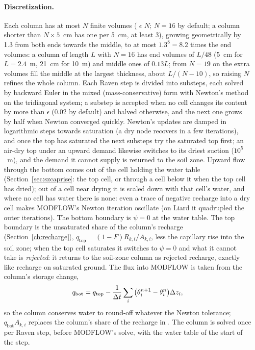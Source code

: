 \paragraph{Discretization.} Each column has at most $N$ finite volumes ( $\epsilon$ $N$;
$N=16$ by default; a column shorter than $N\times5$~cm has one per 5~cm, at least 3), growing geometrically by 1.3 from
both ends towards the middle, to at most $1.3^8=8.2$ times the end volumes: a column of length $L$ with $N=16$ has end
volumes of $L/48$ (5~cm for $L=2.4$~m, 21~cm for 10~m) and middle ones of $0.13L$; from $N=19$ on the extra volumes fill
the middle at the largest thickness, about $L/(N-10)$, so raising $N$ refines the whole column. Each Raven step
is divided into substeps, each solved by backward Euler in the mixed (mass-conservative) form with Newton's method on
the tridiagonal system; a substep is accepted when no cell changes its content by more than $\epsilon$ (0.02 by
default) and halved otherwise, and the next one grows by half when Newton converged quickly. Newton's updates are
damped in logarithmic steps towards saturation (a dry node recovers in a few iterations), and once the top has
saturated the next substeps try the saturated top first; an air-dry top under an upward demand likewise switches to
its driest suction ($10^5$~m), and the demand it cannot supply is returned to the soil zone. Upward flow through the
bottom comes out of the cell holding the water table (Section~\ref{sec:szcaprise}: the top cell, or through
 a cell below it when the top cell has dried); out of a cell near drying it is scaled down with that
cell's water, and where no cell has water there is none: even a trace of negative recharge into a dry cell makes
MODFLOW's Newton iteration oscillate (on Liard it quadrupled the outer iterations). The bottom boundary is
$\psi=0$ at the water table. The top boundary is the unsaturated share of the column's recharge (Section~\ref{ch:recharge}),
$q_{\mathrm{top}}=(1-F)R_{k,i}/A_{k,i}$, less the capillary rise into the soil zone; when the top cell saturates it switches to
$\psi=0$ and what it cannot take is \emph{rejected}: it returns to the soil-zone column as rejected recharge, exactly
like recharge on saturated ground. The flux into MODFLOW is taken from the column's storage change,
\begin{equation}
q_{\mathrm{bot}}=q_{\mathrm{top}}-\frac{1}{\Delta t}\sum_i\big(\theta_i^{n+1}-\theta_i^{n}\big)\Delta z_i,
\end{equation}
so the column conserves water to round-off whatever the Newton tolerance; $q_{\mathrm{bot}}A_{k,i}$ replaces the column's
share of the recharge in . The column is solved once per Raven step, before MODFLOW's solve, with the
water table of the start of the step.

